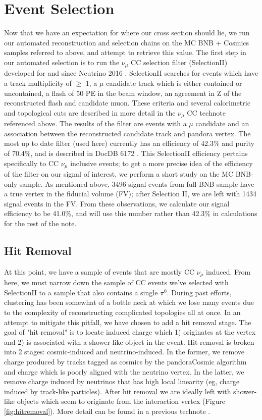 \documentclass[12pt]{article}
\begin{document}
\section {Event Selection}
Now that we have an expectation for where our cross section should lie, we run our automated reconstruction and selection chains on the MC BNB + Cosmics samples referred to above, and attempt to retrieve this value. \noindent The first step in our automated selection is to run the $\nu_\mu$ CC selection filter (SelectionII) developed for and since Neutrino 2016 \cite{bib:numucc}.  SelectionII searches for events which have a track multiplicity of $\geq$ 1, a $\mu$ candidate track which is either contained or uncontained, a flash of 50 PE in the beam window, an agreement in Z of the reconstructed flash and candidate muon. These criteria and several calorimetric and topological cuts are described in more detail in the $\nu_\mu$ CC technote referenced above. The results of the filter are events with a $\mu$ candidate and an association between the reconstructed candidate track and pandora vertex. The most up to date filter (used here) currently has an efficiency of 42.3\% and purity of 70.4\%, and is described in DocDB 6172 \cite{bib:6172}. This SelectionII efficiency pertains specifically to CC $\nu_\mu$ inclusive events; to get a more precise idea of the efficiency of the filter on our signal of interest, we perform a short study on the MC BNB-only sample.  As mentioned above, 3496 signal events from full BNB sample have a true vertex in the fiducial volume (FV); after Selection II, we are left with 1434 signal events in the FV.  From these observations, we calculate our signal efficiency to be 41.0\%, and will use this number rather than 42.3\% in calculations for the rest of the note.

\subsection{Hit Removal}

At this point, we have a sample of events that are mostly CC $\nu_\mu$ induced. From here, we must narrow down the sample of CC events we've selected with SelectionII to a sample that also contains a single $\pi^0$. During past efforts, clustering has been somewhat of a bottle neck at which we lose many events due to the complexity of reconstructing complicated topologies all at once. In an attempt to mitigate this pitfall, we have chosen to add a hit removal stage. The goal of "hit removal" is to locate induced charge which 1) originates at the vertex and 2) is associated with a shower-like object in the event. Hit removal is broken into 2 stages: cosmic-induced and neutrino-induced.  In the former, we remove charge produced by tracks tagged as cosmics by the pandoraCosmic algorithm and charge which is poorly aligned with the neutrino vertex.  In the latter, we remove charge induced by neutrinos that has high local linearity (eg, charge induced by track-like particles). After hit removal we are ideally left with shower-like objects which seem to originate from the interaction vertex (Figure \ref{fig:hitremoval}). More detail can be found in a previous technote \cite{bib:5864}. 
\end{document}
